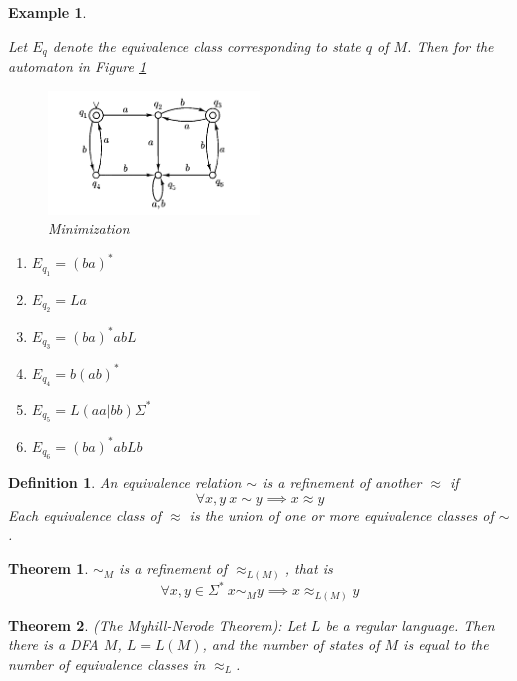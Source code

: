 \documentclass[aps,pra,onecolumn,notitlepage,superscriptaddress]{revtex4-1}
\newtheorem{theo}{Theorem}
\newtheorem{defi}{Definition}
\newtheorem{exa}{Example}
\begin{document}
\begin{exa}
\begin{itemize}
            Let $E_q$ denote the equivalence class corresponding to state $q$ of $M$. Then for the automaton in Figure \ref{minimize}
            \begin{figure}[H]
                \centering
                \includegraphics[width=0.5\textwidth]{minimize.png}
                \caption{Minimization}
                \label{minimize}
            \end{figure}
            \begin{enumerate}
                \item $E_{q_1} = (ba)^*$
                \item $E_{q_2} = La$
                \item $E_{q_3} = (ba)^*abL$
                \item $E_{q_4} = b(ab)^*$
                \item $E_{q_5} = L(aa|bb)\Sigma^*$
                \item $E_{q_6} = (ba)^*abLb$
            \end{enumerate}
        \end{itemize}
    \end{exa}

    \begin{defi}
        An equivalence relation $\sim$ is a refinement of another $\approx$ if
        \begin{equation}
            \forall x,y \ x \sim y \implies x \approx y
        \end{equation}
        Each equivalence class of $\approx$ is the union of one or more equivalence classes of $\sim$.
    \end{defi}

    \begin{theo}
        $\sim_M$ is a refinement of $\approx_{L(M)}$, that is
        \begin{equation}
            \forall x,y \in \Sigma^* \ x \sim_M y \implies x \approx_{L(M)} y
        \end{equation}
    \end{theo}

    \begin{theo}
        (The Myhill-Nerode Theorem): Let $L$ be a regular language. Then there is a DFA $M$, $L = L(M)$, and the number of states of $M$ is equal to the number of equivalence classes in $\approx_L$.
    \end{theo}
\end{document}
